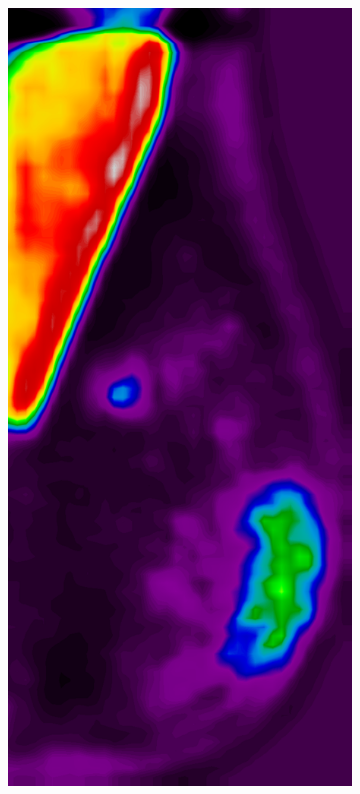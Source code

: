 \documentclass{beamer}
\begin{document}
\begin{frame}
\begin{figure}
\begin{subfigure}{0.134\textwidth}
            \end{subfigure}
            \begin{subfigure}{0.134\textwidth}
	            \centering
		            \includegraphics[width=\textwidth]{plots/examples/example4_probs_2.png}

\end{subfigure}
\end{figure}
\end{frame}
\end{document}
